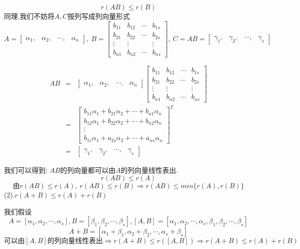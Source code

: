 \begin{anymark}[证明]
$$r(AB)\leq r(B)$$
同理,我们不妨将$A,C$按列写成列向量形式$$A=\left[
\begin{matrix}
	\alpha_{1},&\alpha_{2},&\cdots,&\alpha_{n}
\end{matrix}
\right],\ B=\left[
\begin{matrix}
	b_{11}&b_{12}&\cdots&b_{1s}\\
	b_{21}&b_{22}&\cdots&b_{2s}\\
	\vdots&\vdots& &\vdots\\
	b_{n1}&b_{n2}&\cdots&b_{ns}
\end{matrix}
\right],\ C=AB=\left[
\begin{matrix}
	\gamma_{1},&\gamma_{2},&\cdots,&\gamma_{s}
\end{matrix}
\right]$$

\begin{eqnarray*}
	AB&=&\left[
\begin{matrix}
	\alpha_{1},&\alpha_{2},&\cdots,&\alpha_{n}
\end{matrix}
\right]\left[
\begin{matrix}
	b_{11}&b_{12}&\cdots&b_{1s}\\
	b_{21}&b_{22}&\cdots&b_{2s}\\
	\vdots&\vdots& &\vdots\\
	b_{n1}&b_{n2}&\cdots&b_{ns}
\end{matrix}
\right]\\
	&=&\left[
\begin{matrix}
	b_{11}\alpha_{1}+b_{21}\alpha_{2}+\cdots+b_{n1}\alpha_{n}\\
	b_{12}\alpha_{1}+b_{22}\alpha_{2}+\cdots+b_{n2}\alpha_{n}\\
	\vdots\\
	b_{1s}\alpha_{1}+a_{2s}\alpha_{2}+\cdots+a_{ns}\alpha_{n}
\end{matrix}
\right]^{T}\\
&=&\left[
\begin{matrix}
	\gamma_{1},&\gamma_{2},&\cdots,&\gamma_{s}
\end{matrix}\right]
\end{eqnarray*}

我们可以得到:  $AB\text{的列向量都可以由}A\text{的列向量线性表出}.$
$$r(AB)\leq r(A)$$
$$\text{由}r(AB)\leq r(A),\ r(AB)\leq r(B)\Rightarrow r(AB)\leq min\{r(A),r(B)\}$$
(2).$r(A+B)\leq r(A)+r(B)$

我们假设
$$A=[\alpha_{1},\alpha_{2},\cdots,\alpha_{s}],B=[\beta_{1},\beta_{2},\cdots,\beta_{s}],[A,B]=[\alpha_{1},\alpha_{2},\cdots,\alpha_{s},\beta_{1},\beta_{2},\cdots,\beta_{s}]$$
$$A+B=[\alpha_{1}+\beta_{1},\alpha_{2}+\beta_{2},\cdots,\alpha_{s}+\beta_{s}]
$$
$$\text{可以由}[A,B]\text{的列向量线性表出}\Rightarrow r(A+B)\leq r([A,B])\Rightarrow r(A+B)\leq r(A)+r(B)$$


\end{anymark}
